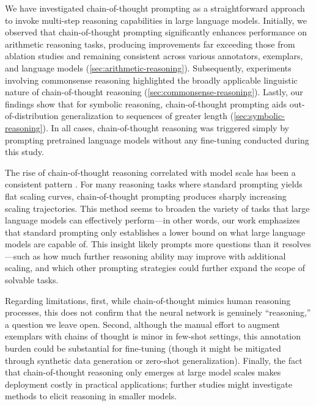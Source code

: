 We have investigated chain-of-thought prompting as a straightforward approach to invoke multi-step reasoning capabilities in large language models. Initially, we observed that chain-of-thought prompting significantly enhances performance on arithmetic reasoning tasks, producing improvements far exceeding those from ablation studies and remaining consistent across various annotators, exemplars, and language models (\cref{sec:arithmetic-reasoning}). Subsequently, experiments involving commonsense reasoning highlighted the broadly applicable linguistic nature of chain-of-thought reasoning (\cref{sec:commonsense-reasoning}). Lastly, our findings show that for symbolic reasoning, chain-of-thought prompting aids out-of-distribution generalization to sequences of greater length (\cref{sec:symbolic-reasoning}). In all cases, chain-of-thought reasoning was triggered simply by prompting pretrained language models without any fine-tuning conducted during this study.

The rise of chain-of-thought reasoning correlated with model scale has been a consistent pattern \citep{wei2022emergent}. For many reasoning tasks where standard prompting yields flat scaling curves, chain-of-thought prompting produces sharply increasing scaling trajectories. This method seems to broaden the variety of tasks that large language models can effectively perform—in other words, our work emphasizes that standard prompting only establishes a lower bound on what large language models are capable of. This insight likely prompts more questions than it resolves—such as how much further reasoning ability may improve with additional scaling, and which other prompting strategies could further expand the scope of solvable tasks.

Regarding limitations, first, while chain-of-thought mimics human reasoning processes, this does not confirm that the neural network is genuinely “reasoning,” a question we leave open. Second, although the manual effort to augment exemplars with chains of thought is minor in few-shot settings, this annotation burden could be substantial for fine-tuning (though it might be mitigated through synthetic data generation or zero-shot generalization).  Finally, the fact that chain-of-thought reasoning only emerges at large model scales makes deployment costly in practical applications; further studies might investigate methods to elicit reasoning in smaller models.

